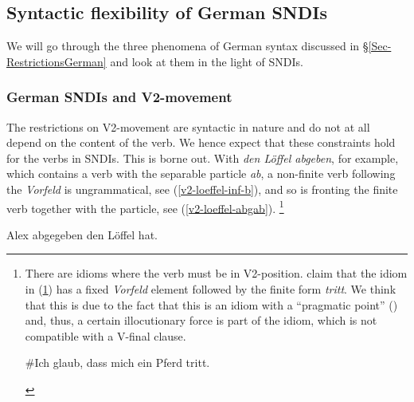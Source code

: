 \documentclass[output=paper]{langsci/langscibook}
\begin{document}
\subsection{Syntactic flexibility of German SNDIs}
\label{Sec-AnalysisGerman}

 We will go through the three phenomena of   German syntax discussed in §\ref{Sec-RestrictionsGerman} and look at them in the light of SNDIs.



\subsubsection{German SNDIs and V2-movement}

The restrictions on V2-movement are syntactic in nature and do not at all depend on the content of the verb. We hence expect that these constraints hold for the verbs in SNDIs. This is borne out. With \textit{den L\"offel abgeben}, for example, which contains a verb with the separable particle \textit{ab}, a non-finite verb following the \emph{Vorfeld} is ungrammatical, see (\ref{v2-loeffel-inf-b}), and so is fronting the finite verb together with the particle, see (\ref{v2-loeffel-abgab}).%
\footnote{\label{fn-pferd}There are idioms where the verb must be in V2-position. \cite{Richter:Sailer:09} claim that the idiom in (\ref{pferd}) has a fixed \emph{Vorfeld} element followed by the finite form \textit{tritt}. We think that this is due to the fact that this is an idiom with a ``pragmatic point'' (\citealt{FillmoreEtAl1988}) and, thus, a certain illocutionary force is part of the idiom, which is not compatible with a V-final clause. 

\begin{exe}
\ex\label{pferd}
\begin{xlist}
\ex \#Ich glaub, dass mich ein Pferd tritt.
\end{xlist}
\end{exe}

}

\begin{exe}
\ex\label{v2-loeffel-inf}
\begin{xlist}
\ex *Alex abgegeben den L\"offel hat.\label{v2-loeffel-inf-b}
\end{xlist}
\end{exe}
\end{document}
